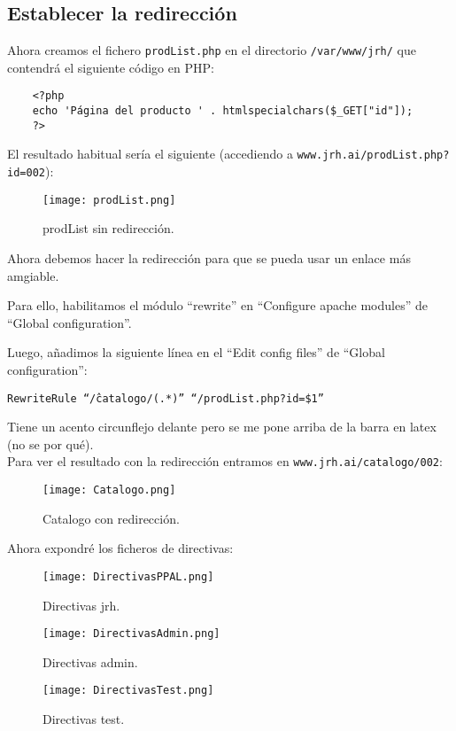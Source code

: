 \documentclass[12pt,letterpaper]{article}
\begin{document}
\subsection{Establecer la redirección}
Ahora creamos el fichero \texttt{prodList.php} en el directorio \texttt{/var/www/jrh/} que contendrá el siguiente código en PHP:
\begin{lstlisting}
	<?php
	echo 'Página del producto ' . htmlspecialchars($_GET["id"]);
	?>
\end{lstlisting}

El resultado habitual sería el siguiente (accediendo a \texttt{www.jrh.ai/prodList.php?id=002}):
\begin{figure}[h]
	\centering
	\texttt{[image: prodList.png]}
	\caption{prodList sin redirección.}
\end{figure}

Ahora debemos hacer la redirección para que se pueda usar un enlace más amgiable.

Para ello, habilitamos el módulo ``rewrite'' en ``Configure apache modules'' de ``Global configuration''.

Luego, añadimos la siguiente línea en el ``Edit config files'' de ``Global configuration'':
\begin{center}
	\texttt{RewriteRule ``\^/catalogo/(.*)'' ``/prodList.php?id=\$1''}
\end{center}
Tiene un acento circunflejo delante pero se me pone arriba de la barra en latex (no se por qué).\\

Para ver el resultado con la redirección entramos en \texttt{www.jrh.ai/catalogo/002}:
\newpage
\begin{figure}[h]
	\centering
	\texttt{[image: Catalogo.png]}
	\caption{Catalogo con redirección.}
	\label{Catalogo con redireccion}
\end{figure}

Ahora expondré los ficheros de directivas:
\begin{figure}[h]
	\centering
	\texttt{[image: DirectivasPPAL.png]}
	\caption{Directivas jrh.}
	\label{Directivas jrh}
\end{figure}

\newpage
\begin{figure}[h]
	\centering
	\texttt{[image: DirectivasAdmin.png]}
	\caption{Directivas admin.}
	\label{Directivas admin}
\end{figure}

\begin{figure}[h]
	\centering
	\texttt{[image: DirectivasTest.png]}
	\caption{Directivas test.}
	\label{Directivas test}
\end{figure}
\end{document}
